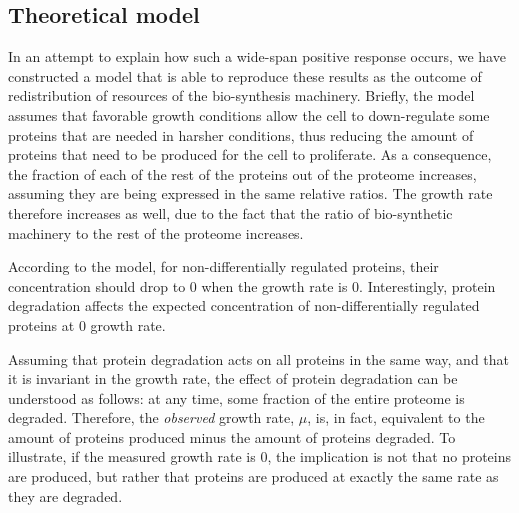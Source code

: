 \documentclass[a4paper,landscape,titlepage,17pt]{extarticle}
\begin{document}
\subsection*{Theoretical model}
In an attempt to explain how such a wide-span positive response occurs, we have constructed a model that is able to reproduce these results as the outcome of redistribution of resources of the bio-synthesis machinery.
Briefly, the model assumes that favorable growth conditions allow the cell to down-regulate some proteins that are needed in harsher conditions, thus reducing the amount of proteins that need to be produced for the cell to proliferate.
As a consequence, the fraction of each of the rest of the proteins out of the proteome increases, assuming they are being expressed in the same relative ratios.
The growth rate therefore increases as well, due to the fact that the ratio of bio-synthetic machinery to the rest of the proteome increases.

According to the model, for non-differentially regulated proteins, their concentration should drop to 0 when the growth rate is 0.
Interestingly, protein degradation affects the expected concentration of non-differentially regulated proteins at 0 growth rate.

Assuming that protein degradation acts on all proteins in the same way, and that it is invariant in the growth rate, the effect of protein degradation can be understood as follows: at any time, some fraction of the entire proteome is degraded.
Therefore, the \emph{observed} growth rate, $\mu$, is, in fact, equivalent to the amount of proteins produced minus the amount of proteins degraded.
To illustrate, if the measured growth rate is 0, the implication is not that no proteins are produced, but rather that proteins are produced at exactly the same rate as they are degraded.

\printbibliography
\end{document}
